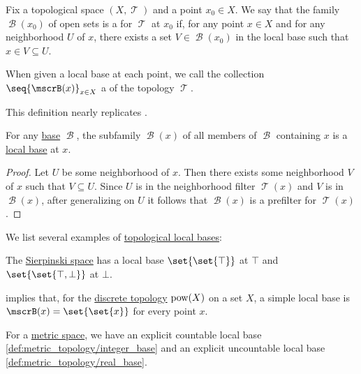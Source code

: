 \begin{definition}\label{def:topological_local_base}
  Fix a topological space \( (X, \mscrT) \) and a point \( x_0 \in X \). We say that the family \( \mscrB(x_0) \) of open sets is a  for \( \mscrT \) at \( x_0 \) if, for any point \( x \in X \) and for any neighborhood \( U \) of \( x \), there exists a set \( V \in \mscrB(x_0) \) in the local base such that \( x \in V \subseteq U \).

  When given a local base at each point, we call the collection \( \seq{ \mscrB(x) }_{x \in X} \) a  of the topology \( \mscrT \).
\end{definition}
\begin{comments}
  \item This definition nearly replicates .
\end{comments}

\begin{proposition}\label{thm:global_base_to_local_base}
  For any \hyperref[def:topological_base]{base} \( \mscrB \), the subfamily \( \mscrB(x) \) of all members of \( \mscrB \) containing \( x \) is a \hyperref[def:topological_local_base]{local base} at \( x \).
\end{proposition}
\begin{proof}
  Let \( U \) be some neighborhood of \( x \). Then there exists some neighborhood \( V \) of \( x \) such that \( V \subseteq U \). Since \( U \) is in the neighborhood filter \( \mscrT(x) \) and \( V \) is in \( \mscrB(x) \), after generalizing on \( U \) it follows that \( \mscrB(x) \) is a prefilter for \( \mscrT(x) \).
\end{proof}

\begin{example}\label{ex:def:topological_local_base}
  We list several examples of \hyperref[def:topological_local_base]{topological local bases}:
  \begin{thmenum}
     The \hyperref[def:sierpinski_space]{Sierpinski space} has a local base \( \set{ \set{ \top } } \) at \( \top \) and \( \set{ \set{ \top, \bot } } \) at \( \bot \).

      implies that, for the \hyperref[def:discrete_topology]{discrete topology} \( \operatorname{pow}(X) \) on a set \( X \), a simple local base is \( \mscrB(x) = \set{ \set{ x } } \) for every point \( x \).

     For a \hyperref[def:metric_space]{metric space}, we have an explicit countable local base \eqref{def:metric_topology/integer_base} and an explicit uncountable local base \eqref{def:metric_topology/real_base}.
  \end{thmenum}
\end{example}

